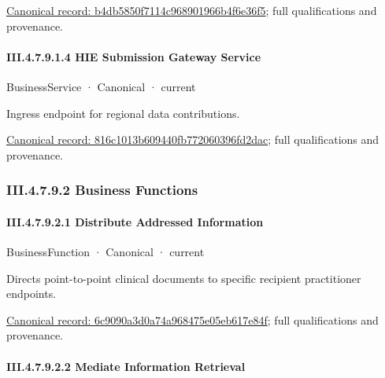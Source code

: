 {\footnotesize \href{../../../../continuum/business/business-service/b4db5850f7114c968901966b4f6e36f5.md}{Canonical record: b4db5850f7114c968901966b4f6e36f5}; full qualifications and provenance.}\par
\paragraph*{III.4.7.9.1.4 HIE Submission Gateway Service}
\label{navigation:III.4.7.9.1.4}

\label{element:816c1013b609440fb772060396fd2dac}
{\small BusinessService · Canonical · current}\par

Ingress endpoint for regional data contributions.


{\footnotesize \href{../../../../continuum/business/business-service/816c1013b609440fb772060396fd2dac.md}{Canonical record: 816c1013b609440fb772060396fd2dac}; full qualifications and provenance.}\par
\subsubsection*{III.4.7.9.2 Business Functions}
\label{navigation:III.4.7.9.2}

\paragraph*{III.4.7.9.2.1 Distribute Addressed Information}
\label{navigation:III.4.7.9.2.1}

\label{element:6c9090a3d0a74a968475e05eb617e84f}
{\small BusinessFunction · Canonical · current}\par

Directs point-to-point clinical documents to specific recipient practitioner endpoints.


{\footnotesize \href{../../../../continuum/business/business-function/6c9090a3d0a74a968475e05eb617e84f.md}{Canonical record: 6c9090a3d0a74a968475e05eb617e84f}; full qualifications and provenance.}\par
\paragraph*{III.4.7.9.2.2 Mediate Information Retrieval}
\label{navigation:III.4.7.9.2.2}

